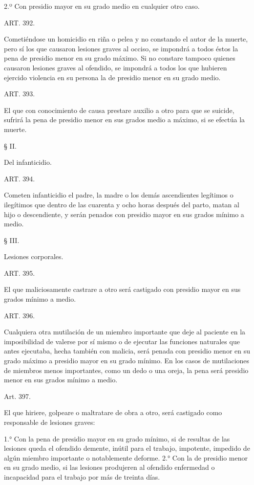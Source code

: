     2.º Con presidio mayor en su grado medio en cualquier otro caso.





    ART. 392.

    Cometiéndose un homicidio en riña o pelea y no constando el autor de la muerte, pero sí los que causaron lesiones graves al occiso, se impondrá a todos éstos la pena de presidio menor en su grado máximo.
    Si no constare tampoco quienes causaron lesiones graves al ofendido, se impondrá a todos los que hubieren ejercido violencia en su persona la de presidio menor en su grado medio.



    ART. 393.

    El que con conocimiento de causa prestare auxilio a otro para que se suicide, sufrirá la pena de presidio menor en sus grados medio a máximo, si se efectúa la muerte.



    § II.

    Del infanticidio.


    ART. 394.

    Cometen infanticidio el padre, la madre o los demás ascendientes legítimos o ilegítimos que dentro de las cuarenta y ocho horas después del parto, matan al hijo o descendiente, y serán penados con presidio mayor en sus grados mínimo a medio.


    § III.

    Lesiones corporales.


    ART. 395.

    El que maliciosamente castrare a otro será castigado con presidio mayor en sus grados mínimo a medio.



    ART. 396.

    Cualquiera otra mutilación de un miembro importante que deje al paciente en la imposibilidad de valerse por sí mismo o de ejecutar las funciones naturales que antes ejecutaba, hecha también con malicia, será penada con presidio menor en su grado máximo a presidio mayor en su grado mínimo.
    En los casos de mutilaciones de miembros menos importantes, como un dedo o una oreja, la pena será presidio menor en sus grados mínimo a medio.


    Art. 397.

    El que hiriere, golpeare o maltratare de obra a otro, será castigado como responsable de lesiones graves:

    1.° Con la pena de presidio mayor en su grado mínimo, si de resultas de las lesiones queda el ofendido demente, inútil para el trabajo, impotente, impedido de algún miembro importante o notablemente deforme.
    2.° Con la de presidio menor en su grado medio, si las lesiones produjeren al ofendido enfermedad o incapacidad para el trabajo por más de treinta días.


